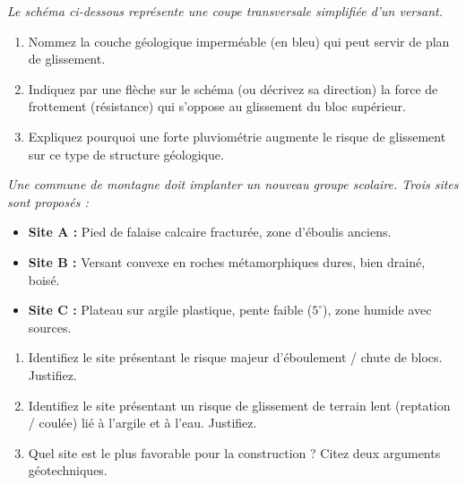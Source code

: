 \documentclass[11pt]{article}
\begin{document}
\begin{exercice}
\emph{Le schéma ci-dessous représente une coupe transversale simplifiée d'un versant.}

\begin{center}
\end{center}

\begin{enumerate}
    \item Nommez la couche géologique imperméable (en bleu) qui peut servir de plan de glissement.
    \item Indiquez par une flèche sur le schéma (ou décrivez sa direction) la force de frottement (résistance) qui s'oppose au glissement du bloc supérieur.
    \item Expliquez pourquoi une forte pluviométrie augmente le risque de glissement sur ce type de structure géologique.
\end{enumerate}
\end{exercice}

\begin{exercice}
\emph{Une commune de montagne doit implanter un nouveau groupe scolaire. Trois sites sont proposés :}
\begin{itemize}
    \item \textbf{Site A :} Pied de falaise calcaire fracturée, zone d'éboulis anciens.
    \item \textbf{Site B :} Versant convexe en roches métamorphiques dures, bien drainé, boisé.
    \item \textbf{Site C :} Plateau sur argile plastique, pente faible ($5^\circ$), zone humide avec sources.
\end{itemize}

\begin{enumerate}
    \item Identifiez le site présentant le risque majeur d'éboulement / chute de blocs. Justifiez.
    \item Identifiez le site présentant un risque de glissement de terrain lent (reptation / coulée) lié à l'argile et à l'eau. Justifiez.
    \item Quel site est le plus favorable pour la construction ? Citez deux arguments géotechniques.
\end{enumerate}
\end{exercice}
\end{document}
